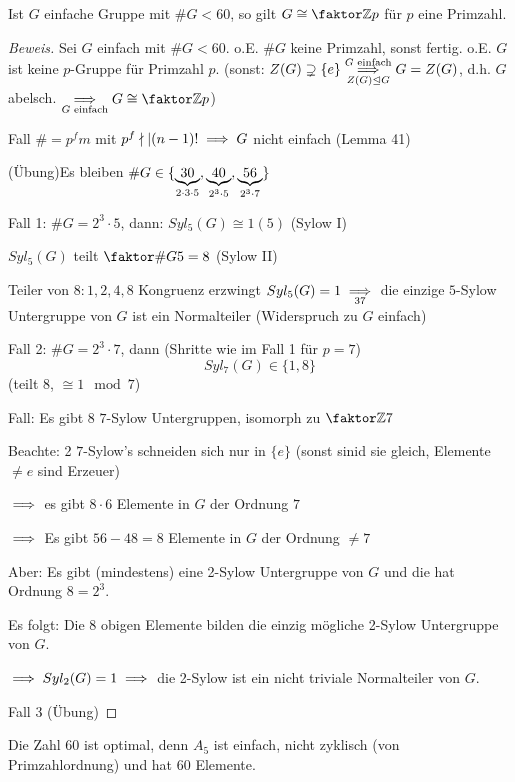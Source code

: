 \documentclass[a4paper]{report}
\begin{document}
\begin{satz}
Ist $G$ einfache Gruppe mit $\#G < 60$, so gilt $G \cong \fak \Z p$ für $p$ eine Primzahl.
\end{satz}
\begin{proof}[Beweis]
  Sei $G$ einfach mit $\#G < 60$. o.E. $\#G$ keine Primzahl, sonst fertig.
  o.E. $G$ ist keine $p$-Gruppe für Primzahl $p$. (sonst: $Z(G) \supsetneq \{e\} \overunderset{G \text{ einfach}}{Z(G) \nt G} \imp G = Z(G)$, d.h. $G$ abelsch. $\underset{G \text{ einfach}} \imp G \cong \fak \Z p$)

  Fall $\# = p^{f}m$ mit $p^{f} \nmid | (n-1)! \implies G$ nicht einfach (Lemma 41)

  (Übung)Es bleiben $\#G \in \{\underbrace{30}_{2 \cdot 3 \cdot 5}, \underbrace{40}_{2^{3} \cdot 5}, \underbrace{56}_{2^{3}\cdot 7}\}$

  Fall 1: $\#G = 2^{3} \cdot 5$, dann:
  $Syl_{5}(G) \cong 1(5)$ (Sylow I)

  $Syl_{5}(G)$ teilt $\fak {\#G}5 = 8$ (Sylow II)

  Teiler von $8: 1, 2, 4, 8$
  Kongruenz erzwingt $Syl_{5}(G) = 1 \underset{37} {\implies}$ die einzige $5$-Sylow Untergruppe von $G$ ist ein Normalteiler (Widerspruch zu $G$ einfach)

  Fall 2: $\# G = 2^{3} \cdot 7$, dann (Shritte wie im Fall 1 für $p=7$)
  \[Syl_{7}(G) \in \{1, 8\}\]
  (teilt $8$, $\cong 1 \mod 7$)

  Fall: Es gibt $8$ $7$-Sylow Untergruppen, isomorph zu $\fak \Z 7$

  Beachte: 2 $7$-Sylow's schneiden sich nur in $\{e\}$ (sonst sinid sie gleich, Elemente $\ne e$ sind Erzeuer)

  $\implies$ es gibt $8\cdot 6$ Elemente in $G$ der Ordnung $7$

  $\implies$ Es gibt $56-48 = 8$ Elemente in $G$ der Ordnung $\ne 7$

  Aber: Es gibt (mindestens) eine 2-Sylow Untergruppe von $G$ und die hat Ordnung $8 = 2^{3}$.

  Es folgt: Die 8 obigen Elemente bilden die einzig mögliche 2-Sylow Untergruppe von $G$.

  $\implies Syl_{2}(G) = 1 \implies$ die 2-Sylow ist ein nicht triviale Normalteiler von $G$.


  Fall 3 (Übung)
\end{proof}
\begin{bem*} Die Zahl 60 ist optimal, denn $A_{5}$ ist einfach, nicht zyklisch (von Primzahlordnung) und hat 60 Elemente.
\end{bem*}
\end{document}
